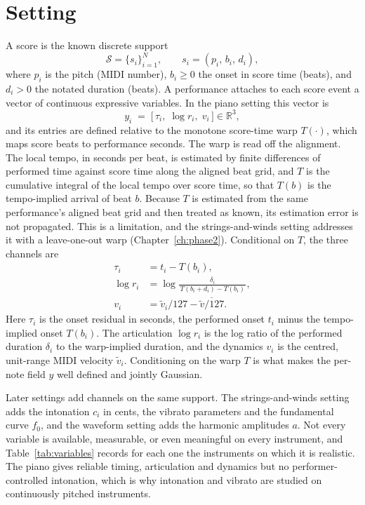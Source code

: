 \documentclass[11pt,a4paper]{report}
\newcommand{\R}{\mathbb{R}}
\newcommand{\score}{\mathcal{S}}
\begin{document}
\section{Setting}
A score is the known discrete support
\begin{equation}
  \score = \{ s_i \}_{i=1}^{N}, \qquad s_i = (p_i,\, b_i,\, d_i),
  \label{eq:support}
\end{equation}
where $p_i$ is the pitch (MIDI number), $b_i \ge 0$ the onset in score time
(beats), and $d_i > 0$ the notated duration (beats). A performance attaches
to each score event a vector of continuous expressive variables. In the piano
setting this vector is
\begin{equation}
  y_i \;=\; \bigl[\, \tau_i,\; \log r_i,\; v_i \,\bigr] \in \R^{3},
  \label{eq:variables}
\end{equation}
and its entries are defined relative to the monotone score-time warp
$T(\cdot)$, which maps score beats to performance seconds. The warp is read
off the alignment. The local tempo, in seconds per beat, is estimated by
finite differences of performed time against score time along the aligned
beat grid, and $T$ is the cumulative integral of the local tempo over score
time, so that $T(b)$ is the tempo-implied arrival of beat $b$. Because $T$ is
estimated from the same performance's aligned beat grid and then treated as
known, its estimation error is not propagated. This is a limitation, and the
strings-and-winds setting addresses it with a leave-one-out warp
(Chapter~\ref{ch:phase2}). Conditional on $T$, the three channels are
\begin{align}
  \tau_i   &= t_i - T(b_i), \label{eq:tau}\\
  \log r_i &= \log \frac{\delta_i}{\,T(b_i + d_i) - T(b_i)\,}, \label{eq:logr}\\
  v_i      &= \tilde v_i / 127 - \overline{\tilde v/127}. \label{eq:vel}
\end{align}
Here $\tau_i$ is the onset residual in seconds, the performed onset $t_i$
minus the tempo-implied onset $T(b_i)$. The articulation $\log r_i$ is the
log ratio of the performed duration $\delta_i$ to the warp-implied duration,
and the dynamics $v_i$ is the centred, unit-range MIDI velocity
$\tilde v_i$. Conditioning on the warp $T$ is what makes the per-note field
$y$ well defined and jointly Gaussian.

Later settings add channels on the same support. The strings-and-winds
setting adds the intonation $c_i$ in cents, the vibrato parameters and the
fundamental curve $f_0$, and the waveform setting adds the harmonic
amplitudes $a$. Not every variable is available, measurable, or even
meaningful on every instrument, and Table~\ref{tab:variables} records for
each one the instruments on which it is realistic. The piano gives reliable
timing, articulation and dynamics but no performer-controlled intonation,
which is why intonation and vibrato are studied on continuously pitched
instruments.
\end{document}
